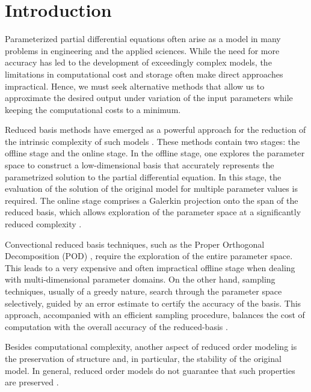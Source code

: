 \section{Introduction}
{\edit Parameterized partial differential equations often arise as a model in many problems in engineering and the applied sciences}. While the need for more accuracy has led to the development of exceedingly complex models, the {\edit limitations in computational cost and storage} often make direct approaches {\edit impractical}. Hence, we must seek alternative methods that allow us to approximate the desired output under variation of the input parameters while keeping the computational costs to a minimum.

Reduced basis methods have emerged as a powerful approach for the reduction of the intrinsic complexity of such models \cite{Ito:1998up,Ito:1998ch,Ito:2001ev,Peterson:1989ki}. These methods contain two stages: {\edit the offline stage and the online stage}. In the offline stage, one explores the parameter space to construct a low-dimensional basis that accurately represents the parametrized solution to the partial differential equation. In this stage, the evaluation of the solution of the original model for multiple parameter values is required. The online stage comprises a Galerkin projection onto the span of the reduced basis, which allows exploration of the parameter space at a significantly reduced complexity \cite{Antoulas:2005:ALD:1088857,Anonymous:2016wl}.

Convectional reduced basis techniques, such as {\blue the} Proper Orthogonal Decomposition (POD) \cite{Kunisch:2002er,Atwell:2001ja,Ravindran:2002hn}, require the exploration of the entire parameter space. This leads to a very expensive and often impractical offline {\edit stage} when dealing with multi-dimensional parameter domains. On the other hand, sampling techniques, usually of a greedy nature, search through the parameter space selectively, guided by an error estimate to certify the accuracy of the basis. This approach, accompanied with an efficient sampling procedure, {\edit balances the cost} of computation with the overall accuracy of the reduced-basis \cite{Cuong:2005gd,Rozza:2005ie,Anonymous:2016wl}.

{\edit Besides} computational complexity, another aspect of reduced order modeling is the preservation of structure and, in particular, {\edit the} stability of the original model. In general, reduced order models do not guarantee that such properties are preserved \cite{Anonymous:pMn0O0Q4}. 

